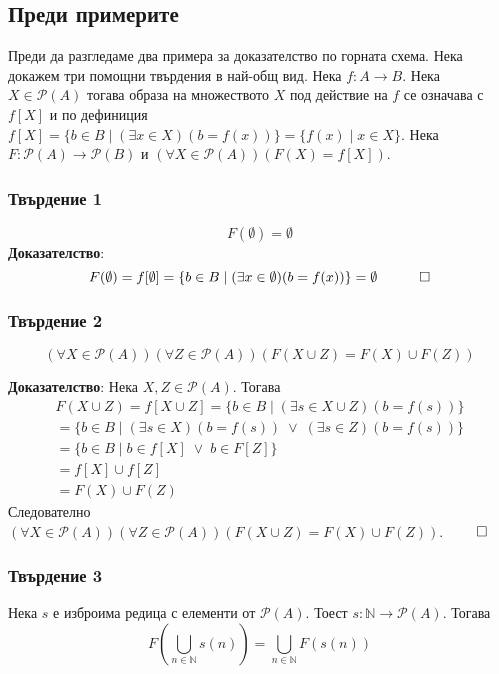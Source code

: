 \documentclass[12pt]{article}
\begin{document}
\subsection*{Преди примерите}
Преди да разгледаме два примера за доказателство по горната схема. Нека докажем три помощни твърдения в най-общ вид.
Нека \(f : A \to B\). Нека \(X \in \mathcal{P}(A)\) тогава образа на множеството \(X\) под действие на \(f\) се означава с \(f[X]\) и по дефиниция \(f[X] = \{b \in B \mid (\exists x \in X)(b = f(x))\} = \{f(x) \mid x \in X\}\).
Нека \(F : \mathcal{P}(A) \to \mathcal{P}(B)\) и \((\forall X \in \mathcal{P}(A))(F(X) = f[X])\).

\subsubsection*{Твърдение 1}
\[F(\emptyset) = \emptyset\]
\textbf{Доказателство}:
\[F(\emptyset) = f[\emptyset] = \{b \in B \mid (\exists x \in \emptyset)(b = f(x))\} = \emptyset \quad \qed\]

\subsubsection*{Твърдение 2}
\[(\forall X \in \mathcal{P}(A))(\forall Z \in \mathcal{P}(A))(F(X \cup Z) = F(X) \cup F(Z))\]

\textbf{Доказателство}: Нека \(X, Z \in \mathcal{P}(A)\). Тогава
\begin{align*}
    F(X \cup Z) = f[X \cup Z] = \{b \in B \mid (\exists s \in X \cup Z)(b = f(s))\} \\
    = \{b \in B \mid (\exists s \in X)(b = f(s)) \;\lor\; (\exists s \in Z)(b = f(s))\} \\
    = \{b \in B \mid b \in f[X] \;\lor\; b \in F[Z]\} \\
    = f[X] \cup f[Z] \\
    = F(X) \cup F(Z)
\end{align*}
Следователно \((\forall X \in \mathcal{P}(A))(\forall Z \in \mathcal{P}(A))(F(X \cup Z) = F(X) \cup F(Z))\). \(\qed\)

\subsubsection*{Твърдение 3}
Нека \(s\) е изброима редица с елементи от \(\mathcal{P}(A)\).
Тоест \(s : \mathbb N \to \mathcal{P}(A)\).
Тогава
\[F\left(\displaystyle\bigcup_{n \in \mathbb N} s(n) \right) = \displaystyle\bigcup_{n \in \mathbb N} F(s(n))\]
\end{document}
